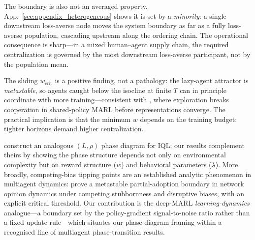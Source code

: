 \documentclass[letterpaper]{article}
\theoremstyle{plain}
\newcommand{\wcrit}{w_{\mathrm{crit}}}
\begin{document}
The boundary is also not an averaged property. App.~\ref{sec:appendix_heterogeneous}
shows it is set by a \emph{minority}: a single downstream loss-averse node
moves the system boundary as far as a fully loss-averse population, cascading
upstream along the ordering chain. The operational consequence is sharp---in a
mixed human--agent supply chain, the required centralization is governed by the
most downstream loss-averse participant, not by the population mean.

The sliding $\wcrit$ is a positive finding, not a pathology: the lazy-agent
attractor is \emph{metastable}, so agents caught below the isocline at finite
$T$ can in principle coordinate with more training---consistent with
\citet{weng2026}, where exploration breaks cooperation in shared-policy MARL
before representations converge. The practical implication is that the minimum
$w$ depends on the training budget: tighter horizons demand higher
centralization.

\citet{yamaguchi2025} construct an analogous $(L,\rho)$ phase diagram for IQL;
our results complement theirs by showing the phase structure depends not only on
environmental complexity but on reward structure ($w$) and behavioral parameters
($\lambda$). More broadly, competing-bias tipping points are an established analytic
phenomenon in multiagent dynamics: \citet{capannoli2026phase} prove a metastable
partial-adoption boundary in network opinion dynamics under competing stubbornness
and disruptive biases, with an explicit critical threshold. Our contribution is
the deep-MARL \emph{learning-dynamics} analogue---a boundary set by the
policy-gradient signal-to-noise ratio rather than a fixed update rule---which
situates our phase-diagram framing within a recognised line of multiagent
phase-transition results.
\end{document}
